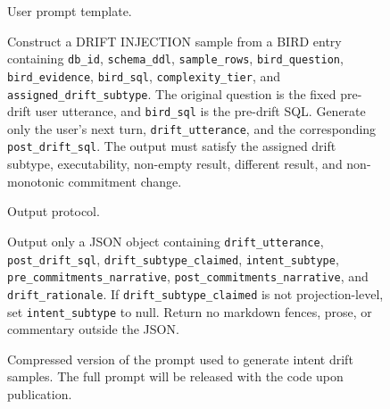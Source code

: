 \begin{figure}[t]
\begin{tcolorbox}[
  width=1.03\textwidth,
  enhanced,
  colback=white,
  colframe=black,
  boxrule=0.5pt,
  arc=0.8mm,
  left=1.6mm,
  right=1.6mm,
  top=1.3mm,
  bottom=1.3mm
]
\vspace{0.35em}
\noindent User prompt template.

\noindent
Construct a DRIFT INJECTION sample from a BIRD entry containing
\texttt{db\_id}, \texttt{schema\_ddl}, \texttt{sample\_rows},
\texttt{bird\_question}, \texttt{bird\_evidence}, \texttt{bird\_sql},
\texttt{complexity\_tier}, and \texttt{assigned\_drift\_subtype}. The original
question is the fixed pre-drift user utterance, and \texttt{bird\_sql} is the
pre-drift SQL. Generate only the user's next turn, \texttt{drift\_utterance}, and
the corresponding \texttt{post\_drift\_sql}. The output must satisfy the assigned
drift subtype, executability, non-empty result, different result, and
non-monotonic commitment change.

\vspace{0.35em}
\noindent Output protocol.

\noindent
Output only a JSON object containing
\texttt{drift\_utterance}, \texttt{post\_drift\_sql},
\texttt{drift\_subtype\_claimed}, \texttt{intent\_subtype},
\texttt{pre\_commitments\_narrative},
\texttt{post\_commitments\_narrative}, and \texttt{drift\_rationale}. If
\texttt{drift\_subtype\_claimed} is not projection-level, set
\texttt{intent\_subtype} to null. Return no markdown fences, prose, or commentary
outside the JSON.

\end{tcolorbox}
\caption{Compressed version of the prompt used to generate intent drift
samples. The full prompt will be released with the code upon publication.}
\label{fig:drift-prompt}
\end{figure}

